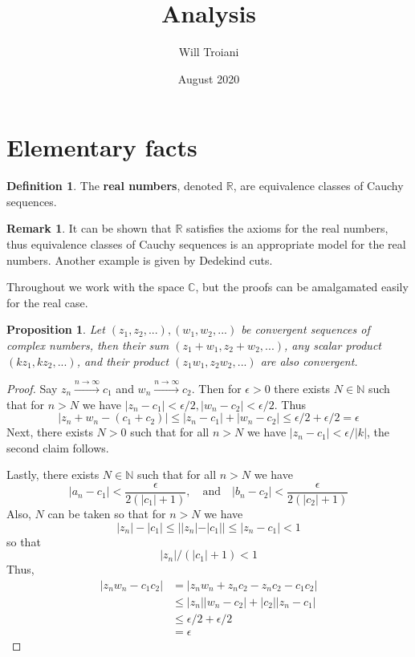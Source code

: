 \documentclass[12pt]{article}
\title{Analysis}
\author{Will Troiani}
\date{August 2020}
\theoremstyle{plain}
\newtheorem{proposition}[thm]{Proposition}
\theoremstyle{definition}
\newtheorem{defn}[thm]{Definition} %
\newtheorem{remark}[thm]{Remark}
\newcommand{\bb}[1]{\mathbb{#1}}
\newcommand{\lto}{\longrightarrow}
\begin{document}
\maketitle
\tableofcontents

\section{Elementary facts}
\begin{defn}
The \textbf{real numbers}, denoted $\bb{R}$, are equivalence classes of Cauchy sequences. 
\end{defn}
\begin{remark}
It can be shown that $\bb{R}$ satisfies the axioms for the real numbers, thus equivalence classes of Cauchy sequences is an appropriate model for the real numbers. Another example is given by Dedekind cuts.
\end{remark}
Throughout we work with the space $\bb{C}$, but the proofs can be amalgamated easily for the real case.
\begin{proposition}
Let $(z_1,z_2,...),(w_1,w_2,...)$ be convergent sequences of complex numbers, then their sum $(z_1 + w_1,z_2 + w_2,...)$, any scalar product $(kz_1,kz_2,...)$, and their product $(z_1w_1,z_2w_2,...)$ are also convergent. 
\end{proposition}
\begin{proof}
Say $z_n\stackrel{n \to \infty}{\lto} c_1$ and $w_n \stackrel{n \to \infty}{\lto} c_2$. Then for $\epsilon > 0$ there exists $N \in \bb{N}$ such that for $n > N$ we have $|z_n - c_1| < \epsilon/2, |w_n - c_2| < \epsilon/2$. Thus
\begin{equation}
|z_n + w_n - (c_1 + c_2)| \leq |z_n - c_1| + |w_n - c_2| \leq \epsilon/2 + \epsilon/2 = \epsilon
\end{equation}
Next, there exists $N>0$ such that for all $n > N$ we have $|z_n - c_1| < \epsilon/|k|$, the second claim follows.

Lastly, there exists $N \in \bb{N}$ such that for all $n > N$ we have
\begin{equation}
|a_n - c_1| < \frac{\epsilon}{2(|c_1| + 1)},\quad\text{and}\quad |b_n -c_2| < \frac{\epsilon}{2(|c_2| + 1)}
\end{equation}
Also, $N$ can be taken so that for $n > N$ we have
\begin{equation}
|z_n| - |c_1| \leq ||z_n| - |c_1|| \leq |z_n - c_1| < 1
\end{equation}
so that
\begin{equation}
|z_n|/(|c_1| + 1) < 1
\end{equation}
Thus,
\begin{align*}
|z_nw_n - c_1c_2| &= |z_nw_n + z_nc_2 - z_nc_2 - c_1c_2|\\
&\leq |z_n||w_n - c_2| + |c_2||z_n - c_1|\\
&\leq \epsilon/2 + \epsilon/2\\
&= \epsilon
\end{align*}
\end{proof}
\end{document}
